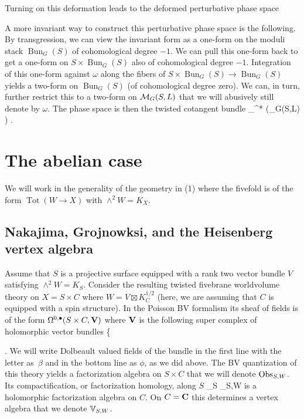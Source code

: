 \documentclass[11pt]{amsart}
\renewcommand{\op}{\operatorname}
\begin{document}
Turning on this deformation leads to the deformed perturbative phase space
\beqn
{}
\eeqn
A more invariant way to construct this perturbative phase space is the following.
By transgression, we can view the invariant form as a one-form on the moduli stack $\op{Bun}_G(S)$ of cohomological degree $-1$.
We can pull this one-form back to get a one-form on $S \times \op{Bun}_G(S)$ also of cohomological degree $-1$.
Integration of this one-form against $\omega$ along the fibers of $S \times \op{Bun}_G(S) \to \op{Bun}_G(S)$ yields a two-form on $\op{Bun}_G(S)$ (of cohomological degree zero).
We can, in turn, further restrict this to a two-form on $\mathcal M_{G}(S,L)$ that we will abusively still denote by $\omega$.
The phase space is then the twisted cotangent bundle
\beqn
\T_{\omega}^* \left(\cM_{G}(S,L) \right) .
\eeqn

\section{The abelian case}

We will work in the generality of the geometry in (1) where the fivefold is of the form $\op{Tot}(W \to X)$ with $\wedge^2 W = K_X$.

\subsection{Nakajima, Grojnowksi, and the Heisenberg vertex algebra}

Assume that $S$ is a projective surface equipped with a rank two vector bundle $V$ satisfying $\wedge^2 W = K_S$.
Consider the resulting twisted fivebrane worldvolume theory on $X = S \times C$ where $W = V \boxtimes K_C^{1/2}$ (here, we are assuming that $C$ is equipped with a spin structure).
In the Poisson BV formalism its sheaf of fields is of the form $\Omega^{0,\bullet}(S \times C,\mathbf V)$ where $\mathbf V$ is the following super complex of holomorphic vector bundles
\beqn
\bV \colon \;\;\;\left\{
 \right.
\eeqn
We will write Dolbeault valued fields of the bundle in the first line with the letter as~$\beta$ and in the bottom line as $\phi$, as we did above.
The BV quantization of this theory yields a factorization algebra on $S \times C$ that we will denote ${\rm Obs}_{S,W}$.
Its compactification, or factorization homology, along $S$
\beqn
\int_S \Obs_{S,W} 
\eeqn
is a holomorphic factorization algebra on $C$.
On $C = \mathbf{C}$ this determines a vertex algebra that we denote $\mathbb V_{S,W}$.
\end{document}
